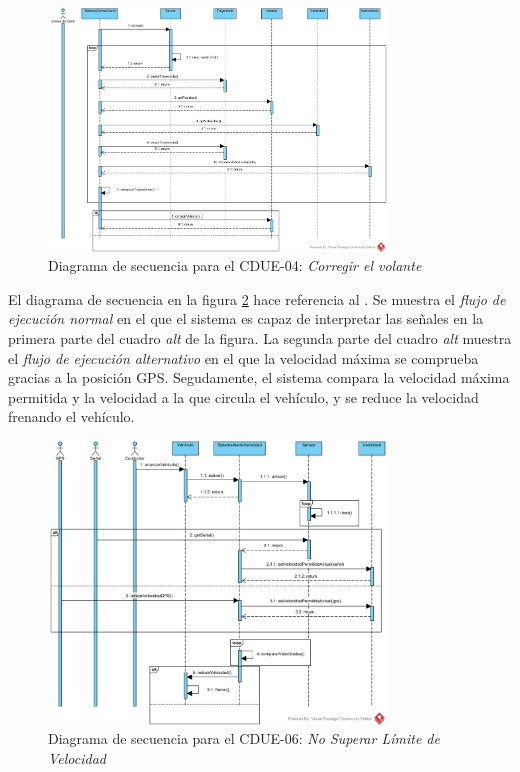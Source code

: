 \begin{figure}[H]
  \begin{center}
    \includegraphics[width=0.8\textwidth]{./img/diagramas_de_secuencia/CDUE-04.png}
  \end{center}
  \caption{Diagrama de secuencia para el CDUE-04: \textit{Corregir el volante}}
  \label{img:corregir_volante}
\end{figure}

\par El diagrama de secuencia  en la figura \ref{img:limite_velocidad} hace referencia al . Se muestra el \textit{flujo de ejecución normal} en el que el sistema es capaz de interpretar las señales en la primera parte del cuadro \textit{alt} de la figura. La segunda parte del cuadro \textit{alt} muestra el \textit{flujo de ejecución alternativo} en el que la velocidad máxima se comprueba gracias a la posición GPS. Segudamente, el sistema compara la velocidad máxima permitida y la velocidad a la que circula el vehículo, y se reduce la velocidad frenando el vehículo.

\begin{figure}[H]
  \begin{center}
    \includegraphics[width=0.8\textwidth]{./img/diagramas_de_secuencia/CDUE-06.png}
  \end{center}
  \caption{Diagrama de secuencia para el CDUE-06: \textit{No Superar Límite de Velocidad}}
  \label{img:limite_velocidad}
\end{figure}


